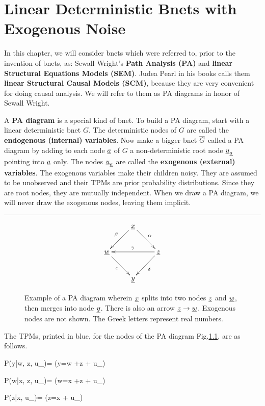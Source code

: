\chapter{Linear Deterministic Bnets with Exogenous 
Noise}\label{ch-linear-sys}

In this chapter, we will consider 
bnets which were referred to,
prior to the invention of bnets, as:
Sewall Wright's {\bf Path Analysis (PA)}
 and
{\bf linear Structural Equations Models (SEM)}.
Judea Pearl in his
books calls them
{\bf linear Structural Causal Models (SCM)},
because they are very 
convenient for doing causal analysis.
We will refer  to
them as PA diagrams
in honor of Sewall Wright.


A {\bf PA diagram}
is a special kind of bnet.
To 
build a PA diagram,
start with a 
linear deterministic bnet $G$.
The deterministic
nodes of $G$ are called
the {\bf endogenous (internal) variables}.
Now make a bigger bnet $\overline{G}$
called a PA diagram
by 
adding to each node ${\underline{a}}$ of $G$ a
non-deterministic  
root node ${\underline{u}}_{\underline{a}}$
pointing into ${\underline{a}}$ only.
The nodes ${\underline{u}}_{\underline{a}}$ are called
the {\bf exogenous (external) variables}.
The exogenous
variables make their children noisy.
They are assumed 
to be unobserved
and their TPMs are prior
probability distributions.
Since they are 
root nodes, they are 
mutually independent.
When we
draw
a PA diagram,
we will
never draw the exogenous nodes,
leaving them implicit.

\hrule{}


\begin{figure}[h!]
$$\xymatrix{
&\rvx\ar[dl]_\beta\ar[dr]^\alp
\\
\rvw\ar[dr]_\epsilon&&\rvz\ar[ll]_\gamma\ar[dl]^\delta
\\
&\rvy
}$$
\caption{
Example of a
PA diagram wherein
${\underline{x}}$ splits
into two nodes ${\underline{z}}$
and ${\underline{w}}$,
then merges into node ${\underline{y}}$.
There is also an arrow
${\underline{z}}\rightarrow {\underline{w}}$.
Exogenous
nodes are not shown.
The Greek letters
represent 
real numbers.
}
\label{fig-scm-diamond}
\end{figure}

The TPMs, printed in blue,
for the nodes of the PA diagram 
Fig.\ref{fig-scm-diamond},
are as follows.

\beq\color{blue}
P(y|w, z, u_\rvy)=
\indi(y=\epsilon w +\delta z
+ u_\rvy)
\eeq

\beq\color{blue}
P(w|x, z, u_\rvw)=
\indi(w=\beta x +\gamma z + u_\rvw)
\eeq

\beq\color{blue}
P(z|x, u_\rvz)=
\indi(z=\alpha x + u_\rvz)
\eeq


